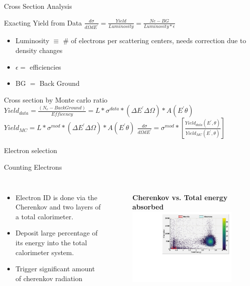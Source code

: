 \documentclass{beamer}
\begin{document}
\begin{frame}{Cross Section Analysis}
	\begin{block}{Exacting Yield from Data}
		\centering
		$\frac{d\sigma}{d\Omega dE^\prime} =  \frac{Yield}{Luminosity} = \frac{Ne - BG }{Luminosity *  \epsilon} $
		\begin{itemize}
			\item Luminosity $\equiv$ \# of electrons per scattering centers, needs correction due to density changes
			\item $\epsilon = $ efficiencies
			\item  BG $ = $ Back Ground
		\end{itemize}
	\end{block}	
	\begin{block}{Cross section by Monte carlo ratio}	
		$ Yield_{data} = \frac{\left(N_e - BackGround\right)}{Efficency } =  \textit{L} *\sigma^{data} * \left( \Delta E^\prime \Delta \Omega\right)*  A \left(E^\prime \theta \right)$
		$ Yield_{MC} = \textit{L} *\sigma^{mod} * \left( \Delta E^\prime \Delta \Omega\right)*  A \left(E^\prime \theta \right)$
		\centering $ \frac{d\sigma}{d\Omega dE^\prime} = \sigma^{mod} * \left[\frac{Yield_{data} \left( 
			E^\prime,\theta\right)} {Yield_{MC}\left(E^\prime,\theta\right)}\right] $
	\end{block}	
\end{frame}
\begin{frame}{Electron selection}
	\begin{block}{Counting Electrons}
		\begin{columns}
			\begin{itemize}
 		 		\setlength{\parskip}{0pt}
				\setlength{\itemsep}{0pt plus 1pt}
				\item Electron ID is done via the Cherenkov and two layers of a total calorimeter.
				\item Deposit large percentage of its energy into the total calorimeter system.
				\item Trigger significant amount of cherenkov radiation
			\end{itemize}		
			\begin{figure}
					\textbf{Cherenkov vs. Total energy absorbed}
					\includegraphics[width=7.0cm]{../images/PID_2d.pdf}
			\end{figure}
		\end{columns}
	\end{block}
\end{frame}
\end{document}
